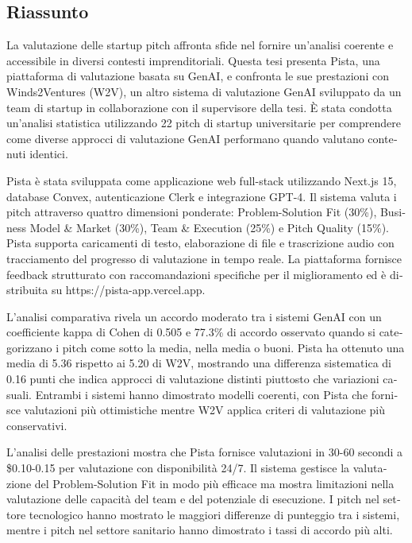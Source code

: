 \begin{otherlanguage}{italian}
\chapter*{Riassunto}

La valutazione delle startup pitch affronta sfide nel fornire un'analisi coerente e accessibile in diversi contesti imprenditoriali. Questa tesi presenta Pista, una piattaforma di valutazione basata su GenAI, e confronta le sue prestazioni con Winds2Ventures (W2V), un altro sistema di valutazione GenAI sviluppato da un team di startup in collaborazione con il supervisore della tesi. È stata condotta un'analisi statistica utilizzando 22 pitch di startup universitarie per comprendere come diverse approcci di valutazione GenAI performano quando valutano contenuti identici.

Pista è stata sviluppata come applicazione web full-stack utilizzando Next.js 15, database Convex, autenticazione Clerk e integrazione GPT-4. Il sistema valuta i pitch attraverso quattro dimensioni ponderate: Problem-Solution Fit (30\%), Business Model \& Market (30\%), Team \& Execution (25\%) e Pitch Quality (15\%). Pista supporta caricamenti di testo, elaborazione di file e trascrizione audio con tracciamento del progresso di valutazione in tempo reale. La piattaforma fornisce feedback strutturato con raccomandazioni specifiche per il miglioramento ed è distribuita su https://pista-app.vercel.app.

L'analisi comparativa rivela un accordo moderato tra i sistemi GenAI con un coefficiente kappa di Cohen di 0.505 e 77.3\% di accordo osservato quando si categorizzano i pitch come sotto la media, nella media o buoni. Pista ha ottenuto una media di 5.36 rispetto ai 5.20 di W2V, mostrando una differenza sistematica di 0.16 punti che indica approcci di valutazione distinti piuttosto che variazioni casuali. Entrambi i sistemi hanno dimostrato modelli coerenti, con Pista che fornisce valutazioni più ottimistiche mentre W2V applica criteri di valutazione più conservativi.

L'analisi delle prestazioni mostra che Pista fornisce valutazioni in 30-60 secondi a \$0.10-0.15 per valutazione con disponibilità 24/7. Il sistema gestisce la valutazione del Problem-Solution Fit in modo più efficace ma mostra limitazioni nella valutazione delle capacità del team e del potenziale di esecuzione. I pitch nel settore tecnologico hanno mostrato le maggiori differenze di punteggio tra i sistemi, mentre i pitch nel settore sanitario hanno dimostrato i tassi di accordo più alti.


\end{otherlanguage}
